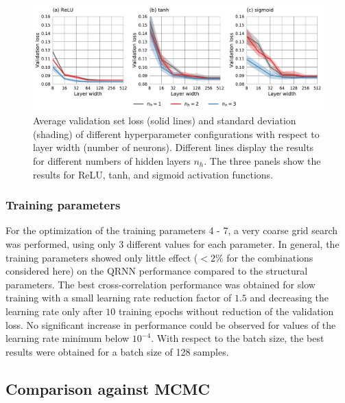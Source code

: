 \documentclass[journal abbreviation, manuscript]{copernicus}
\begin{document}
  \begin{figure}[hbpt!]
    \centering
    \includegraphics[width = 1.0\linewidth]{../plots/fig02}
    \caption{Average validation set loss (solid lines) and standard deviation (shading)
             of different hyperparameter configurations with respect to layer width (number of neurons).
             Different lines display the results for different numbers of hidden layers $n_h$.
             The three panels show the results for ReLU, tanh, and sigmoid activation functions.}
    \label{fig:hyperparams}
  \end{figure}

 \subsubsection{Training parameters}
 
For the optimization of the training parameters 4 - 7, a very coarse grid
search was performed, using only 3 different values for each parameter.
In general, the training parameters showed only little effect ($< 2\%$ for the
combinations considered here) on the QRNN performance compared to the structural
parameters. The best cross-correlation performance was obtained for slow
training with a small learning rate reduction factor of $1.5$ and decreasing the
learning rate only after $10$ training epochs without reduction of the
validation loss. No significant increase in performance could be observed for
values of the learning rate minimum below $10^{-4}$. With respect to the batch
size, the best results were obtained for a batch size of 128 samples.

\subsection{Comparison against MCMC}
  
\end{document}
